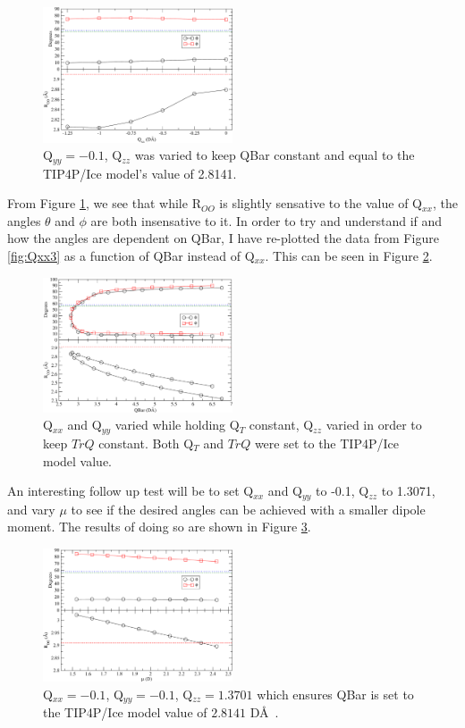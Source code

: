 \documentclass[aps, jcp, prl, reprint, groupedaddress, superscriptaddress, twocolumn]{revtex4-1}
\begin{document}
\begin{figure}[h!]
\includegraphics[width=0.5\textwidth]{Test20_plot.pdf}
\caption{\label{fig:Qyy2} Q$_{yy} = -0.1$, Q$_{zz}$ was varied to keep QBar constant and equal to the TIP4P/Ice model's value of 2.8141.}
\end{figure}

From Figure \ref{fig:Qyy2}, we see that while R$_{OO}$ is slightly sensative
to the value of Q$_{xx}$, the angles $\theta$ and $\phi$ are both insensative
to it. In order to try and understand if and how the angles are dependent
on QBar, I have re-plotted the data from Figure \ref{fig:Qxx3} as a function
of QBar instead of Q$_{xx}$. This can be seen in Figure \ref{fig:QBar2}.

\begin{figure}[h!]
\includegraphics[width=0.5\textwidth]{Test5_plot2.pdf}
\caption{\label{fig:QBar2}Q$_{xx}$ and Q$_{yy}$ varied while holding Q$_T$ constant, Q$_{zz}$ varied in order to keep $TrQ$ constant. Both Q$_T$ and $TrQ$ were set to the TIP4P/Ice model value.}
\end{figure} 

An interesting follow up test will be 
to set Q$_{xx}$ and Q$_{yy}$ to -0.1, Q$_{zz}$ to 1.3071, and vary $\mu$ to 
see if the desired angles can be achieved with a smaller dipole moment. The
results of doing so are shown in Figure \ref{fig:mu2}.

\begin{figure}[h!]
\includegraphics[width=0.5\textwidth]{Test22_plot.pdf}
\caption{\label{fig:mu2} Q$_{xx} = -0.1$, Q$_{yy} = -0.1$, Q$_{zz} = 1.3701$ which ensures QBar is set to the TIP4P/Ice model value of $2.8141$ D\AA~.}
\end{figure}
\end{document}
